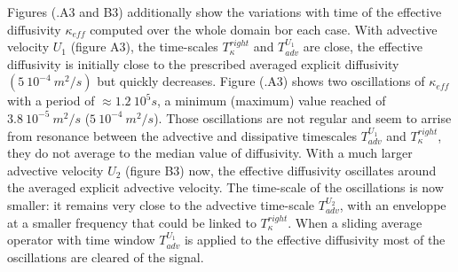Figures (.A3 and B3) additionally show the variations with time of the effective diffusivity $\kappa_{eff}$ computed over the whole domain bor each case. 
With advective velocity $U_1$ (figure A3), the time-scales $T_{\kappa}^{right}$ and $T_{adv}^{U_1}$ are close, the effective diffusivity is initially close to the prescribed averaged explicit diffusivity $(5 \ 10^{-4} \ m^2/s)$ but quickly decreases. Figure (.A3) shows two oscillations of $\kappa_{eff}$ with a period of $\approx 1.2 \ 10^5s$, a minimum (maximum) value reached of $3.8 \ 10^{-5} \ m^2/s$ ($5 \ 10^{-4} \ m^2/s$). Those oscillations are not regular and seem to arrise from resonance between the advective and dissipative timescales $T_{adv}^{U_1}$ and $T_{\kappa}^{right}$, they do not average to the median value of diffusivity.
With a much larger advective velocity $U_2$ (figure B3) now, the effective diffusivity oscillates around the averaged explicit advective velocity. The time-scale of the oscillations is now smaller: it remains very close to the advective time-scale $T_{adv}^{U_2}$, with an enveloppe at a smaller frequency that could be linked to $T_{\kappa}^{right}$. When a sliding average operator with time window $T_{adv}^{U_1}$ is applied to the effective diffusivity most of the oscillations are cleared of the signal.

